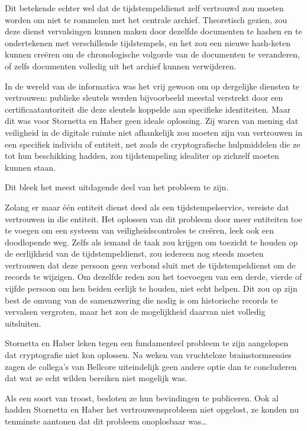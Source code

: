 \documentclass[smalldemyvopaper,11pt,twoside,onecolumn,openright,extrafontsizes,hidelinks]{memoir}
\begin{document}
Dit betekende echter wel dat de tijdstempeldienst zelf vertrouwd zou
moeten worden om niet te rommelen met het centrale archief. Theoretisch
gezien, zou deze dienst vervalsingen kunnen maken door dezelfde
documenten te hashen en te ondertekenen met verschillende tijdstempels,
en het zou een nieuwe hash-keten kunnen creëren om de chronologische
volgorde van de documenten te veranderen, of zelfs documenten volledig
uit het archief kunnen verwijderen.

In de wereld van de informatica was het vrij gewoon om op dergelijke
diensten te vertrouwen: publieke sleutels werden bijvoorbeeld meestal
verstrekt door een certificaatautoriteit die deze sleutels koppelde aan
specifieke identiteiten. Maar dit was voor Stornetta en Haber geen
ideale oplossing. Zij waren van mening dat veiligheid in de digitale
ruimte niet afhankelijk zou moeten zijn van vertrouwen in een specifiek
individu of entiteit, net zoals de cryptografische hulpmiddelen die ze
tot hun beschikking hadden, zou tijdstempeling idealiter op zichzelf
moeten kunnen staan.

Dit bleek het meest uitdagende deel van het probleem te zijn.

Zolang er maar één entiteit dienst deed als een tijdstempelservice,
vereiste dat vertrouwen in die entiteit. Het oplossen van dit probleem
door meer entiteiten toe te voegen om een systeem van
veiligheidscontroles te creëren, leek ook een doodlopende weg. Zelfs als
iemand de taak zou krijgen om toezicht te houden op de eerlijkheid van
de tijdstempeldienst, zou iedereen nog steeds moeten vertrouwen dat deze
persoon geen verbond sluit met de tijdstempeldienst om de records te
wijzigen. Om dezelfde reden zou het toevoegen van een derde, vierde of
vijfde persoon om hen beiden eerlijk te houden, niet echt helpen. Dit
zou op zijn best de omvang van de samenzwering die nodig is om
historische records te vervalsen vergroten, maar het zou de mogelijkheid
daarvan niet volledig uitsluiten.

Stornetta en Haber leken tegen een fundamenteel probleem te zijn
aangelopen dat cryptografie niet kon oplossen. Na weken van vruchteloze
brainstormsessies zagen de collega's van Bellcore uiteindelijk geen
andere optie dan te concluderen dat wat ze echt wilden bereiken niet
mogelijk was.

Als een soort van troost, besloten ze hun bevindingen te publiceren. Ook
al hadden Stornetta en Haber het vertrouwensprobleem niet opgelost, ze
konden nu tenminste aantonen dat dit probleem onoplosbaar was\ldots{}
\end{document}
